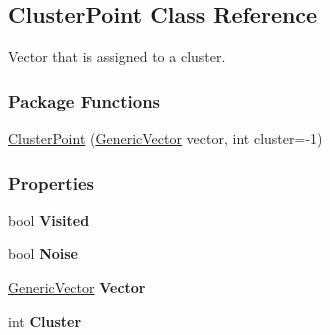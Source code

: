 \hypertarget{classDataTools_1_1clustering_1_1ClusterPoint}{}\subsection{Cluster\+Point Class Reference}
\label{classDataTools_1_1clustering_1_1ClusterPoint}


Vector that is assigned to a cluster.  


\subsubsection*{Package Functions}
\begin{DoxyCompactItemize}
\item 
\hyperlink{classDataTools_1_1clustering_1_1ClusterPoint_ad883ecd18ede56e817024bf3c7f04f8f_ad883ecd18ede56e817024bf3c7f04f8f}{Cluster\+Point} (\hyperlink{classDataTools_1_1GenericVector}{Generic\+Vector} vector, int cluster=-\/1)
\end{DoxyCompactItemize}
\subsubsection*{Properties}
\begin{DoxyCompactItemize}
\item 
\mbox{\label{classDataTools_1_1clustering_1_1ClusterPoint_ac647a81dc5fb9f1e28c4918555a6934d}} 
bool {\bfseries Visited}
\item 
\mbox{\label{classDataTools_1_1clustering_1_1ClusterPoint_a14869f07df4b46efad374f848283ab46}} 
bool {\bfseries Noise}
\item 
\mbox{\label{classDataTools_1_1clustering_1_1ClusterPoint_a1fb0820f89dadb4bd9f6d2c7ba3c0b21}} 
\hyperlink{classDataTools_1_1GenericVector}{Generic\+Vector} {\bfseries Vector}
\item 
\mbox{\label{classDataTools_1_1clustering_1_1ClusterPoint_a34bb5a9cd67b234bb8b6a149255bd992}} 
int {\bfseries Cluster}
\end{DoxyCompactItemize}


